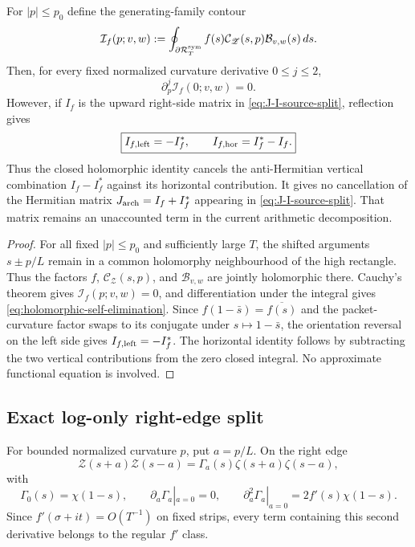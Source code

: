 \begin{lemma}
\label{lem:holomorphic-self-elimination}
For $|p|\le p_0$ define the generating-family contour
\[
\mathcal I_f(p;v,w):=
\oint_{\partial\mathcal R_T^{\rm sym}}
 f(s)\mathcal C_{\mathscr Z}(s,p)\mathcal B_{v,w}(s)\,ds.
\]
Then, for every fixed normalized curvature derivative $0\le j\le2$,
\begin{equation}
\boxed{
\partial_p^j\mathcal I_f(0;v,w)=0.
}
\label{eq:holomorphic-self-elimination}
\end{equation}
However, if $I_f$ is the upward right-side matrix in
\eqref{eq:J-I-source-split}, reflection gives
\begin{equation}
\boxed{I_{f,\rm left}=-I_f^*,\qquad
I_{f,\rm hor}=I_f^*-I_f.}
\label{eq:f-self-orientation-correction}
\end{equation}
Thus the closed holomorphic identity cancels the anti-Hermitian vertical
combination $I_f-I_f^*$ against its horizontal contribution. It gives no
cancellation of the Hermitian matrix
$J_{\rm arch}=I_f+I_f^*$ appearing in
\eqref{eq:J-I-source-split}. That matrix remains an unaccounted term in the
current arithmetic decomposition.
\end{lemma}

\begin{proof}
For all fixed $|p|\le p_0$ and sufficiently large $T$, the shifted arguments
$s\pm p/L$ remain in a common holomorphy neighbourhood of the high rectangle.
Thus the factors $f$, $\mathcal C_{\mathscr Z}(s,p)$, and
$\mathcal B_{v,w}$ are jointly holomorphic there.  Cauchy's theorem gives
$\mathcal I_f(p;v,w)=0$, and differentiation under the integral gives
\eqref{eq:holomorphic-self-elimination}. Since
$f(1-\bar s)=\overline{f(s)}$ and the packet-curvature factor swaps to its
conjugate under $s\mapsto1-\bar s$, the orientation reversal on the left side
gives $I_{f,\rm left}=-I_f^*$. The horizontal identity follows by subtracting
the two vertical contributions from the zero closed integral. No approximate
functional equation is involved.
\end{proof}

\subsection{Exact log-only right-edge split}
For bounded normalized curvature $p$, put $a=p/L$. On the right edge
\[
\mathscr Z(s+a)\mathscr Z(s-a)
=\Gamma_a(s)\zeta(s+a)\zeta(s-a),
\]
with
\[
\Gamma_0(s)=\chi(1-s),
\qquad
\partial_a\Gamma_a|_{a=0}=0,
\qquad
\partial_a^2\Gamma_a|_{a=0}=2f'(s)\chi(1-s).
\]
Since $f'(\sigma+it)=O(T^{-1})$ on fixed strips, every term containing this
second derivative belongs to the regular $f'$ class.

